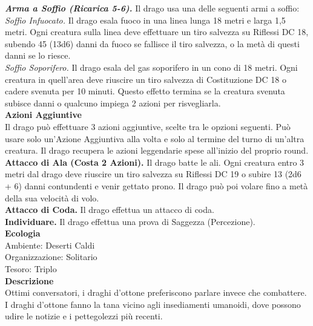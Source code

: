 \begin{multicols}{2}
\emph{\textbf{Arma a Soffio (Ricarica 5-6).}} Il drago usa una delle seguenti armi a soffio:\\
\emph{Soffio Infuocato.} Il drago esala fuoco in una linea lunga 18 metri e larga 1,5 metri. Ogni creatura sulla linea deve effettuare un tiro salvezza su Riflessi DC 18, subendo 45 (13d6) danni da fuoco se fallisce il tiro salvezza, o la metà di questi danni se lo riesce.\\
\emph{Soffio Soporifero.} Il drago esala del gas soporifero in un cono di 18 metri. Ogni creatura in quell'area deve riuscire un tiro salvezza di Costituzione DC 18 o cadere svenuta per 10 minuti. Questo effetto termina se la creatura svenuta subisce danni o qualcuno impiega 2 azioni per risvegliarla.\\
\textbf{Azioni Aggiuntive}\\
Il drago può effettuare 3 azioni aggiuntive, scelte tra le opzioni seguenti. Può usare solo un'Azione Aggiuntiva alla volta e solo al termine del turno di un'altra creatura. Il drago recupera le azioni leggendarie spese all'inizio del proprio round.\\
\textbf{Attacco di Ala (Costa 2 Azioni).} Il drago batte le ali. Ogni creatura entro 3 metri dal drago deve riuscire un tiro salvezza su Riflessi DC 19 o subire 13 (2d6 + 6) danni contundenti e venir gettato prono. Il drago può poi volare fino a metà della sua velocità di volo.\\
\textbf{Attacco di Coda.} Il drago effettua un attacco di coda.\\
\textbf{Individuare.} Il drago effettua una prova di Saggezza (Percezione).\\
\textbf{Ecologia}\\
Ambiente: Deserti Caldi\\
Organizzazione: Solitario\\
Tesoro: Triplo\\
\textbf{Descrizione}\\
Ottimi conversatori, i draghi d’ottone preferiscono parlare invece che combattere. I draghi d’ottone fanno la tana vicino agli insediamenti umanoidi, dove possono udire le notizie e i pettegolezzi più recenti.\\



\end{multicols}
